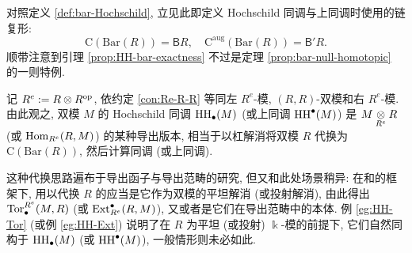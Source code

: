 \begin{example}
	对照定义 \ref{def:bar-Hochschild}, 立见此即定义 Hochschild 同调与上同调时使用的链复形:
	\[ \mathrm{C}(\mathrm{Bar}(R)) = \mathsf{B} R, \quad \mathrm{C}^{\mathrm{aug}}(\mathrm{Bar}(R)) = \mathsf{B}' R. \]
	顺带注意到引理 \ref{prop:HH-bar-exactness} 不过是定理 \ref{prop:bar-null-homotopic} 的一则特例.
	
	记 $R^e := R \otimes R^{\operatorname{op}}$, 依约定 \ref{con:Re-R-R} 等同左 $R^e$-模, $(R, R)$-双模和右 $R^e$-模. 由此观之, 双模 $M$ 的 Hochschild 同调 $\operatorname{HH}_\bullet(M)$ (或上同调 $\operatorname{HH}^\bullet(M)$) 是 $M \underset{R^e}{\otimes} R$ (或 $\operatorname{Hom}_{R^e}(R, M)$) 的某种导出版本, 相当于以杠解消将双模 $R$ 代换为 $\mathrm{C}(\mathrm{Bar}(R))$, 然后计算同调 (或上同调).
	
	这种代换思路遍布于导出函子与导出范畴的研究, 但又和此处场景稍异: 在和的框架下, 用以代换 $R$ 的应当是它作为双模的平坦解消 (或投射解消), 由此得出 $\operatorname{Tor}^{R^e}_\bullet(M, R)$ (或 $\operatorname{Ext}^\bullet_{R^e}(R, M)$), 又或者是它们在导出范畴中的本体. 例 \ref{eg:HH-Tor} (或例 \ref{eg:HH-Ext}) 说明了在 $R$ 为平坦 (或投射) $\Bbbk$-模的前提下, 它们自然同构于 $\operatorname{HH}_\bullet(M)$ (或 $\operatorname{HH}^\bullet(M)$), 一般情形则未必如此.
\end{example}

